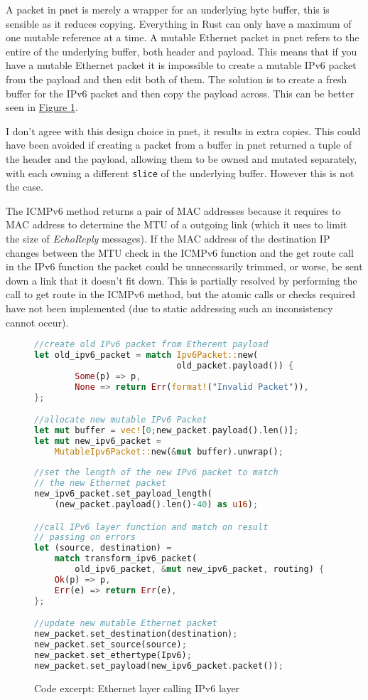 \documentclass[12pt,a4paper,twoside,openany]{report}
\begin{document}
A packet in pnet is merely a wrapper for an underlying byte buffer, this is sensible as it reduces copying.  Everything in Rust can only have a maximum of one mutable reference at a time.  A mutable Ethernet packet in pnet refers to the entire of the underlying buffer, both header and payload.  This means that if you have a mutable Ethernet packet it is impossible to create a mutable IPv6 packet from the payload and then edit both of them.  The solution is to create a fresh buffer for the IPv6 packet and then copy the payload across. This can be better seen in  \hyperref[fig::mutability]{Figure }\ref{fig::mutability}.

I don't agree with this design choice in pnet, it results in extra copies. This could have been avoided if creating a packet from a buffer in pnet returned a tuple of the header and the payload, allowing them to be owned and mutated separately, with each owning a different \verb!slice! of the underlying buffer.  However this is not the case. 

The ICMPv6 method returns a pair of MAC addresses because it requires to MAC address to determine the MTU of a outgoing link (which it uses to limit the size of \textit{EchoReply} messages).  If the MAC address of the destination IP changes between the MTU check in the ICMPv6 function and the get route call in the IPv6 function the packet could be unnecessarily trimmed, or worse, be sent down a link that it doesn't fit down. This is partially resolved by performing the call to get route in the ICMPv6 method, but the atomic calls or checks required have not been implemented (due to static addressing such an inconsistency cannot occur).

\begin{figure}
\centering
\begin{varwidth}{\linewidth}
\begin{lstlisting}[language=Rust]
//create old IPv6 packet from Etherent payload
let old_ipv6_packet = match Ipv6Packet::new(
                            old_packet.payload()) {
        Some(p) => p,
        None => return Err(format!("Invalid Packet")),
};

//allocate new mutable IPv6 Packet
let mut buffer = vec![0;new_packet.payload().len()];
let mut new_ipv6_packet = 
    MutableIpv6Packet::new(&mut buffer).unwrap();
    
//set the length of the new IPv6 packet to match
// the new Ethernet packet
new_ipv6_packet.set_payload_length(
    (new_packet.payload().len()-40) as u16);

//call IPv6 layer function and match on result
// passing on errors
let (source, destination) = 
    match transform_ipv6_packet(
        old_ipv6_packet, &mut new_ipv6_packet, routing) {
    Ok(p) => p,
    Err(e) => return Err(e),
};

//update new mutable Ethernet packet
new_packet.set_destination(destination);
new_packet.set_source(source);
new_packet.set_ethertype(Ipv6);
new_packet.set_payload(new_ipv6_packet.packet());
\end{lstlisting}
\end{varwidth}
\caption{Code excerpt: Ethernet layer calling IPv6 layer}
\label{fig::mutability}
\end{figure}
\end{document}
